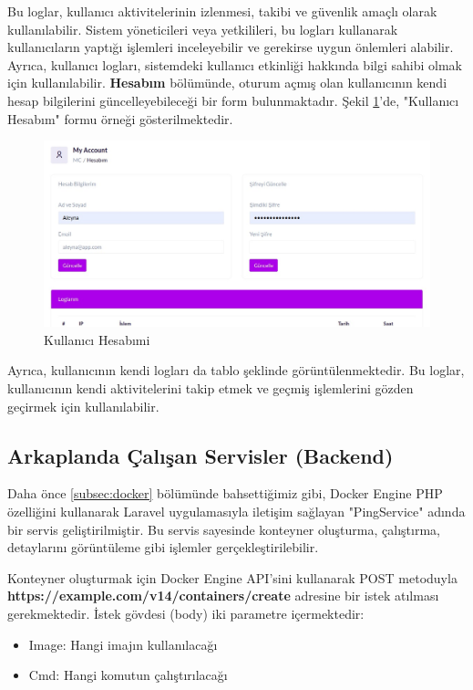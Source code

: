 Bu loglar, kullanıcı aktivitelerinin izlenmesi, takibi ve güvenlik amaçlı olarak kullanılabilir. Sistem yöneticileri veya yetkilileri, bu logları kullanarak kullanıcıların yaptığı işlemleri inceleyebilir ve gerekirse uygun önlemleri alabilir. Ayrıca, kullanıcı logları, sistemdeki kullanıcı etkinliği hakkında bilgi sahibi olmak için kullanılabilir.
\textbf{Hesabım} bölümünde, oturum açmış olan kullanıcının kendi hesap bilgilerini güncelleyebileceği bir form bulunmaktadır. Şekil \ref{fig:account}'de, "Kullanıcı Hesabım" formu örneği gösterilmektedir.
\begin{figure}[ht]
	\centering
	\includegraphics[width=0.7\linewidth]{images/account.jpeg}
	\caption{Kullanıcı Hesabımi}
	\label{fig:account}
\end{figure}

Ayrıca, kullanıcının kendi logları da tablo şeklinde görüntülenmektedir. Bu loglar, kullanıcının kendi aktivitelerini takip etmek ve geçmiş işlemlerini gözden geçirmek için kullanılabilir.

\subsection{Arkaplanda Çalışan Servisler (Backend)}

Daha önce \ref{subsec:docker} bölümünde bahsettiğimiz gibi, Docker Engine PHP özelliğini kullanarak Laravel uygulamasıyla iletişim sağlayan "PingService" adında bir servis geliştirilmiştir. Bu servis sayesinde konteyner oluşturma, çalıştırma, detaylarını görüntüleme gibi işlemler gerçekleştirilebilir.

Konteyner oluşturmak için Docker Engine API'sini kullanarak POST metoduyla \textbf{https://example.com/v14/containers/create}  adresine bir istek atılması gerekmektedir. İstek gövdesi (body) iki parametre içermektedir:
\begin{itemize}
	\item Image: Hangi imajın kullanılacağı
	\item Cmd: Hangi komutun çalıştırılacağı
\end{itemize}

